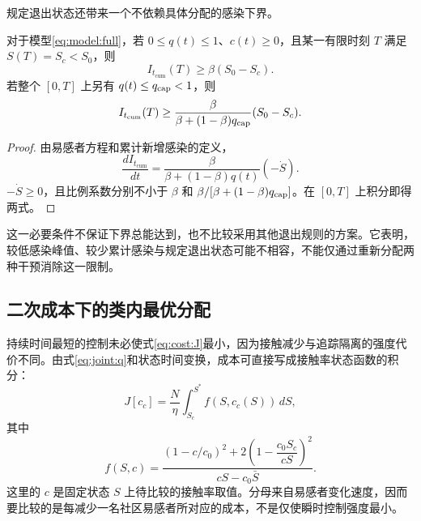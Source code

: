 \documentclass[lang=cn,a4paper,newtx]{elegantpaper}
\numberwithin{equation}{section}
\theoremstyle{plain}
\newcommand{\Itcum}{I_{t_{\mathrm{cum}}}}
\begin{document}
规定退出状态还带来一个不依赖具体分配的感染下界。
\begin{proposition}
\label{prop:exit-infection-lower-bound}
对于模型\eqref{eq:model:full}，若 $0\le q(t)\le1$、$c(t)\ge0$，且某一有限时刻 $T$ 满足 $S(T)=S_c<S_0$，则
\begin{equation}
\Itcum(T)\ge\beta(S_0-S_c).
\label{eq:exit-infection-lower-bound}
\end{equation}
若整个 $[0,T]$ 上另有 $q(t)\le q_{\rm cap}<1$，则
\begin{equation}
\Itcum(T)\ge
\frac{\beta}{\beta+(1-\beta)q_{\rm cap}}(S_0-S_c).
\label{eq:exit-infection-capped}
\end{equation}
\end{proposition}
\begin{proof}
由易感者方程和累计新增感染的定义，
\[
\frac{d\Itcum}{dt}
=\frac{\beta}{\beta+(1-\beta)q(t)}(-\dot S).
\]
$-\dot S\ge0$，且比例系数分别不小于 $\beta$ 和
$\beta/[\beta+(1-\beta)q_{\rm cap}]$。在 $[0,T]$ 上积分即得两式。
\end{proof}
这一必要条件不保证下界总能达到，也不比较采用其他退出规则的方案。它表明，较低感染峰值、较少累计感染与规定退出状态可能不相容，不能仅通过重新分配两种干预消除这一限制。

\subsection{二次成本下的类内最优分配}
\label{sec:joint:cost}
持续时间最短的控制未必使式\eqref{eq:cost:J}最小，因为接触减少与追踪隔离的强度代价不同。由式\eqref{eq:joint:q}和状态时间变换，成本可直接写成接触率状态函数的积分：
\begin{equation}
J[c_c]=\frac{N}{\eta}\int_{S_c}^{S^*}f(S,c_c(S))\,dS,
\label{eq:joint:cost}
\end{equation}
其中
\begin{equation}
f(S,c)=
\frac{(1-c/c_0)^2+2\left(1-\dfrac{c_0S_c}{cS}\right)^2}
{cS-c_0\bar S}.
\label{eq:joint:cost-integrand}
\end{equation}
这里的 $c$ 是固定状态 $S$ 上待比较的接触率取值。分母来自易感者变化速度，因而要比较的是每减少一名社区易感者所对应的成本，不是仅使瞬时控制强度最小。
\end{document}
